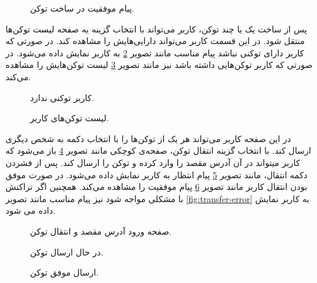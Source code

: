 \begin{figure}
\centerline{}
\caption{پیام موفقیت در ساخت توکن.}
\label{fig:mint-success}
\end{figure}

پس از ساخت یک یا چند توکن، کاربر می‌تواند با انتخاب گزینه
یه صفحه لیست توکن‌ها منتقل شود.
در این قسمت کاربر می‌تواند دارایی‌هایش را مشاهده کند.
در صورتی که کاربر دارای توکنی نباشد پیام مناسب مانند تصویر
\ref{fig:no-tokens-yet}
به کاربر نمایش داده می‌شود.
در صورتی که کاربر توکن‌هایی داشته باشد نیز مانند تصویر
\ref{fig:tokens-list}
لیست توکن‌هایش را مشاهده می‌کند.


\begin{figure}
\centerline{}
\caption{کاربر توکنی ندارد.}
\label{fig:no-tokens-yet}
\end{figure}

\begin{figure}
\centerline{}
\caption{لیست توکن‌های کاربر.}
\label{fig:tokens-list}
\end{figure}

در این صفحه کاربر می‌تواند هر یک از توکن‌ها را با انتخاب دکمه
به شخص دیگری ارسال کند.
با انتخاب گزینه انتقال توکن،
صفحه‌ی کوچکی مانند تصویر
\ref{fig:transfer-modal}
باز می‌شود که کاربر میتواند در آن آدرس مقصد را وارد کرده و توکن را ارسال کند.
پس از فشردن دکمه انتقال، مانند تصویر
\ref{fig:transfer-loading}
پیام انتظار به کاربر نمابش داده می‌شود.
در صورت موفق بودن انتقال کاربر مانند تصویر
\ref{fig:transfer-success}
پیام موفقیت را مشاهده می‌کند.
همچنین اگر تراکنش با مشکلی مواجه شود نیز پیام مناسب مانند تصویر
\ref{fig:transfer-error}
به کاربر نمایش داده می شود.

\begin{figure}[H]
\centerline{}
\caption{صفحه ورود آدرس مقصد و انتقال توکن.}
\label{fig:transfer-modal}
\end{figure}

\begin{figure}[H]
\centerline{}
\caption{در حال ارسال توکن.}
\label{fig:transfer-loading}
\end{figure}

\begin{figure}[H]
\centerline{}
\caption{ارسال موفق توکن.}
\label{fig:transfer-success}
\end{figure}

